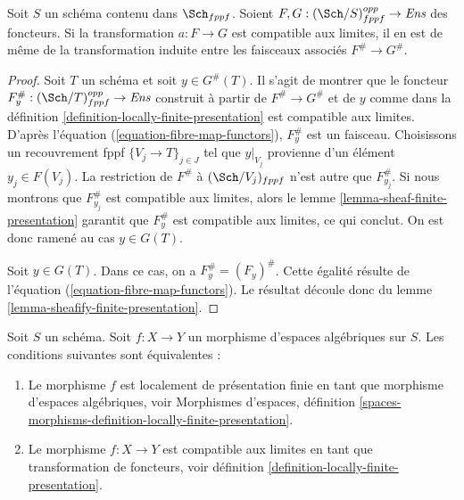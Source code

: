 \begin{lemma}
\label{lemma-sheafify-finite-presentation-map}
Soit $S$ un schéma contenu dans $\Sch_{fppf}$.
Soient $F, G : (\Sch/S)_{fppf}^{opp} \to \textit{Ens}$ des foncteurs.
Si la transformation $a : F \to G$ est compatible aux limites,
il en est de même de la transformation induite entre les faisceaux associés
$F^\# \to G^\#$.
\end{lemma}

\begin{proof}
Soit $T$ un schéma et soit $y \in G^\#(T)$.
Il s'agit de montrer que le foncteur
$F^\#_y : (\Sch/T)_{fppf}^{opp} \to \textit{Ens}$
construit à partir de $F^\# \to G^\#$ et de $y$ comme dans
la définition \ref{definition-locally-finite-presentation}
est compatible aux limites.
D'après l'équation (\ref{equation-fibre-map-functors}),
$F^\#_y$ est un faisceau. Choisissons un recouvrement fppf
$\{V_j \to T\}_{j \in J}$ tel que $y|_{V_j}$ provienne
d'un élément $y_j \in F(V_j)$.
La restriction de $F^\#$ à $(\Sch/V_j)_{fppf}$
n'est autre que $F^\#_{y_j}$. Si nous montrons que $F^\#_{y_j}$
est compatible aux limites, alors
le lemme \ref{lemma-sheaf-finite-presentation}
garantit que $F^\#_y$ est compatible aux limites,
ce qui conclut. On est donc ramené au cas $y \in G(T)$.

\medskip\noindent
Soit $y \in G(T)$. Dans ce cas, on a $F^\#_y = (F_y)^\#$.
Cette égalité résulte de
l'équation (\ref{equation-fibre-map-functors}).
Le résultat découle donc du
lemme \ref{lemma-sheafify-finite-presentation}.
\end{proof}

\begin{proposition}
\label{proposition-characterize-locally-finite-presentation}
Soit $S$ un schéma. Soit $f : X \to Y$ un morphisme d'espaces algébriques
sur $S$. Les conditions suivantes sont équivalentes :
\begin{enumerate}
\item Le morphisme $f$ est localement de présentation finie en tant que
morphisme d'espaces algébriques, voir
Morphismes d'espaces,
définition \ref{spaces-morphisms-definition-locally-finite-presentation}.
\item Le morphisme $f : X \to Y$ est compatible aux limites en tant que
transformation de foncteurs, voir
définition \ref{definition-locally-finite-presentation}.
\end{enumerate}
\end{proposition}

